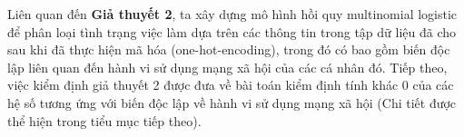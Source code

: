 \begin{table}[h!]
    \centering
    \caption{Bảng contingency}
    \label{tab:contingency_table}
\end{table}

Liên quan đến \textbf{Giả thuyết 2}, ta xây dựng mô hình hồi quy multinomial logistic để phân loại tình trạng việc làm dựa trên các thông tin trong tập dữ liệu đã cho sau khi đã thực hiện mã hóa (one-hot-encoding), trong đó có bao gồm biến độc lập liên quan đến hành vi sử dụng mạng xã hội của các cá nhân đó. Tiếp theo, việc kiểm định giả thuyết 2 được đưa về bài toán kiểm định tính khác 0 của các hệ số tương ứng với biến độc lập về hành vi sử dụng mạng xã hội (Chi tiết được thể hiện trong tiểu mục tiếp theo). 

